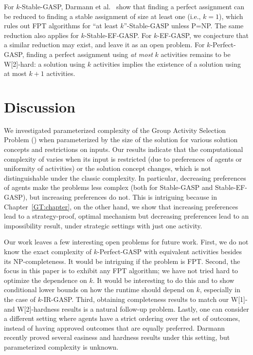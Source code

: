 For $k$-Stable-GASP, Darmann et al.~\cite{GASP12WINE} show that finding a perfect assignment can be reduced to finding a stable assignment of size at least one (i.e., $k=1$), which rules out FPT algorithms for ``at least $k$''-Stable-GASP unless P=NP. The same reduction also applies for $k$-Stable-EF-GASP.
For $k$-EF-GASP, we conjecture that a similar reduction may exist, and leave it as an open problem.
For $k$-Perfect-GASP, finding a perfect assignment using {\em at most} $k$ activities remains to be W[2]-hard: a solution using $k$ activities implies the existence of a solution using at most $k+1$ activities.





\section{Discussion} \label{GASP:sec:discussion}





We investigated parameterized complexity of the Group Activity Selection Problem (\GASP) when parameterized by the size of the solution for various solution concepts and restrictions on inputs.
Our results indicate that the computational complexity of \GASPs varies when its input is restricted (due to preferences of agents or uniformity of activities) or the solution concept changes, which is not distinguishable under the classic complexity. In particular, decreasing preferences of agents make the problems less complex (both for Stable-GASP and Stable-EF-GASP), but increasing preferences do not. This is intriguing because in Chapter~\ref{GT:chapter}, on the other hand, we show that increasing preferences lead to a strategy-proof, optimal mechanism but decreasing preferences lead to an impossibility result, under strategic settings with just one activity.

Our work leaves a few interesting open problems for future work. 
First, we do not know the exact complexity of $k$-Perfect-GASP with equivalent activities besides its NP-completeness. It would be intriguing if the problem is FPT.
Second, the focus in this paper is to exhibit any FPT algorithm; we have not tried hard to optimize the dependence on $k$. It would be interesting to do this and to show conditional lower bounds on how the runtime should depend on $k$, especially in the case of $k$-IR-GASP. 
Third, obtaining completeness results to match our W[1]- and W[2]-hardness results is a natural follow-up problem.
Lastly, one can consider a different setting where agents have a strict ordering over the set of outcomes, instead of having approved outcomes that are equally preferred. Darmann~\cite{DARMANN15ADT} recently proved several easiness and hardness results under this setting, but parameterized complexity is unknown.

